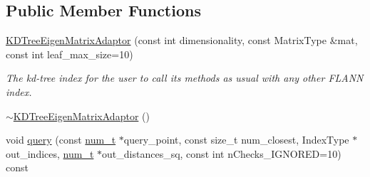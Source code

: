 \subsection*{Public Member Functions}
\begin{DoxyCompactItemize}
\item 
\hyperlink{structnanoflann_1_1_k_d_tree_eigen_matrix_adaptor_a759c2f83af5ae8a3446f450b41b31a58}{K\-D\-Tree\-Eigen\-Matrix\-Adaptor} (const int dimensionality, const Matrix\-Type \&mat, const int leaf\-\_\-max\-\_\-size=10)
\begin{DoxyCompactList}\small\item\em The kd-\/tree index for the user to call its methods as usual with any other F\-L\-A\-N\-N index. \end{DoxyCompactList}\item 
\hyperlink{structnanoflann_1_1_k_d_tree_eigen_matrix_adaptor_a9f5156a35b8f3eb56b7e15ab2853ef3f}{$\sim$\-K\-D\-Tree\-Eigen\-Matrix\-Adaptor} ()
\item 
void \hyperlink{structnanoflann_1_1_k_d_tree_eigen_matrix_adaptor_a65ad5a444a16a474351e39b7775accaa}{query} (const \hyperlink{structnanoflann_1_1_k_d_tree_eigen_matrix_adaptor_a5198c559d4134cbb14767e10d6945748}{num\-\_\-t} $\ast$query\-\_\-point, const size\-\_\-t num\-\_\-closest, Index\-Type $\ast$out\-\_\-indices, \hyperlink{structnanoflann_1_1_k_d_tree_eigen_matrix_adaptor_a5198c559d4134cbb14767e10d6945748}{num\-\_\-t} $\ast$out\-\_\-distances\-\_\-sq, const int n\-Checks\-\_\-\-I\-G\-N\-O\-R\-E\-D=10) const 
\end{DoxyCompactItemize}
